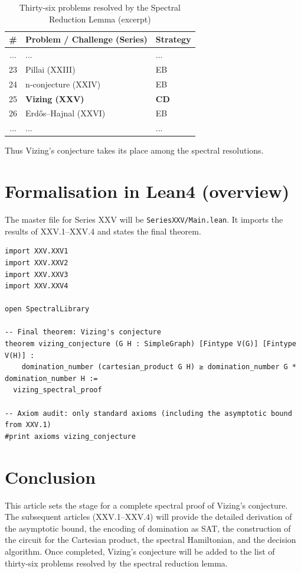 \documentclass[11pt,a4paper]{article}
\begin{document}
\begin{center}
\begin{longtable}{@{}cll@{}}
\caption{Thirty‑six problems resolved by the Spectral Reduction Lemma (excerpt)}\\
\toprule
\# & Problem / Challenge (Series) & Strategy \\
\midrule
... & ... & ... \\
23 & Pillai (XXIII) & EB \\
24 & n‑conjecture (XXIV) & EB \\
25 & \textbf{Vizing (XXV)} & \textbf{CD} \\
26 & Erdős–Hajnal (XXVI) & EB \\
... & ... & ... \\
\bottomrule
\end{longtable}
\end{center}

Thus Vizing's conjecture takes its place among the spectral resolutions.

\section{Formalisation in Lean4 (overview)}

The master file for Series XXV will be \texttt{SeriesXXV/Main.lean}. It imports the results of XXV.1–XXV.4 and states the final theorem.

\begin{lstlisting}[style=lean, caption={MainXXV.lean (sketch)}]
import XXV.XXV1
import XXV.XXV2
import XXV.XXV3
import XXV.XXV4

open SpectralLibrary

-- Final theorem: Vizing's conjecture
theorem vizing_conjecture (G H : SimpleGraph) [Fintype V(G)] [Fintype V(H)] :
    domination_number (cartesian_product G H) ≥ domination_number G * domination_number H :=
  vizing_spectral_proof

-- Axiom audit: only standard axioms (including the asymptotic bound from XXV.1)
#print axioms vizing_conjecture
\end{lstlisting}

\section{Conclusion}

This article sets the stage for a complete spectral proof of Vizing's conjecture. The subsequent articles (XXV.1–XXV.4) will provide the detailed derivation of the asymptotic bound, the encoding of domination as SAT, the construction of the circuit for the Cartesian product, the spectral Hamiltonian, and the decision algorithm. Once completed, Vizing's conjecture will be added to the list of thirty‑six problems resolved by the spectral reduction lemma.
\end{document}
